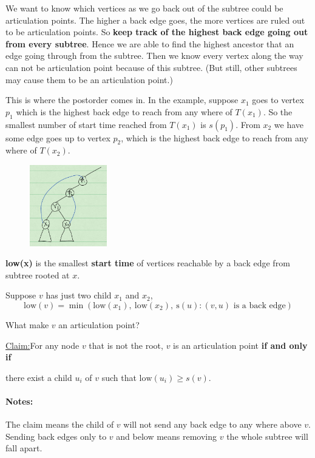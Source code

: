 \documentclass[en,hazy,blue,normal,12pt]{elegantnote}
\newenvironment{claim}[1]{\par\noindent\underline{Claim:}\space#1}{}
\begin{document}
We want to know which vertices as we go back out of the subtree could be 
articulation points. The higher a back edge goes, the more vertices are ruled 
out to be articulation points. So \textbf{keep track of the highest back edge 
going out from every subtree}. Hence we are able to find the highest ancestor 
that an edge going through from the subtree. Then we know every vertex along the 
way can not be articulation point because of this subtree. (But still, other 
subtrees may cause them to be an articulation point.)

This is where the postorder comes in. In the example, suppose $x_1$ goes to vertex $p_1$ which is the highest back edge to reach from any where of $T(x_1)$. So the smallest number of start time reached from $T(x_1)$ is $s(p_1)$. From $x_2$ we have some edge goes up to vertex $p_2$, which is the highest back edge to reach from any where of $T(x_2)$.

\begin{figure}[H]
\centering
\includegraphics[width=0.3\textwidth]{dfs-claim.png}
\end{figure}

\begin{definition}
 \textbf{low(x)} is the smallest \textbf{start time} of vertices reachable by a back edge from subtree rooted at $x$. 
\end{definition}

Suppose $v$ has just two child $x_1$ and $x_2$,
\[\text{low}(v) = \min (\text{low}(x_1), ~\text{low}(x_2), ~\text{s}(u): (v, u) \text{ is a back edge})\]

What make $v$ an articulation point?
\begin{claim}
 For any node $v$ that is not the root, $v$ is an articulation point \textbf{if 
and only if }
 
 there exist a child $u_i$ of $v$ such that $\text{low}(u_i) \ge s(v)$.
\end{claim}

\paragraph{Notes:} The claim means the child of $v$ will not send any back edge 
to any where above $v$. Sending back edges only to $v$ and below means removing 
$v$ the whole subtree will fall apart.
\end{document}
